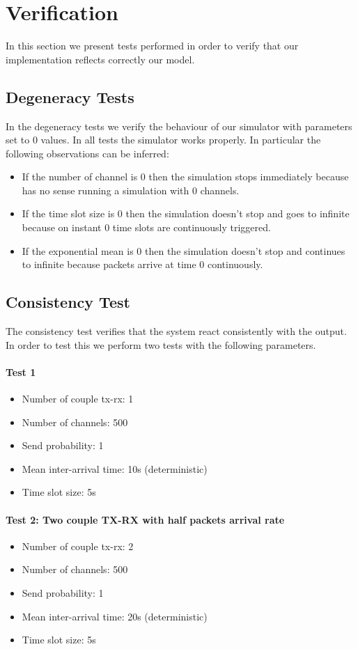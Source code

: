\section{Verification}
In this section we present tests performed in order to verify that our implementation reflects correctly our model.

\subsection{Degeneracy Tests}
In the degeneracy tests we verify the behaviour of our simulator with parameters set to 0 values. In all tests the simulator works properly. In particular the following observations can be inferred:
\begin{itemize}
	\item If the number of channel is 0 then the simulation stops immediately because has no sense running a simulation with 0 channels.
	\item If the time slot size is 0 then the simulation doesn't stop and goes to infinite because on instant 0  time slots are continuously triggered.
	\item If the exponential mean is 0 then the simulation doesn't stop and continues to infinite because packets arrive at time 0 continuously.
\end{itemize}

\subsection{Consistency Test}
The consistency test verifies that the system react consistently with the output. In order to test this we perform two tests with the following parameters.
\paragraph{Test 1}
\begin{itemize}
	\item Number of couple tx-rx: 1
	\item Number of channels: 500
	\item Send probability: 1
	\item Mean inter-arrival time: 10s (deterministic)
	\item Time slot size: 5s
\end{itemize}

\paragraph{Test 2: Two couple TX-RX with half packets arrival rate}
\begin{itemize}
	\item Number of couple tx-rx: 2
	\item Number of channels: 500
	\item Send probability: 1
	\item Mean inter-arrival time: 20s (deterministic)
	\item Time slot size: 5s
\end{itemize}


